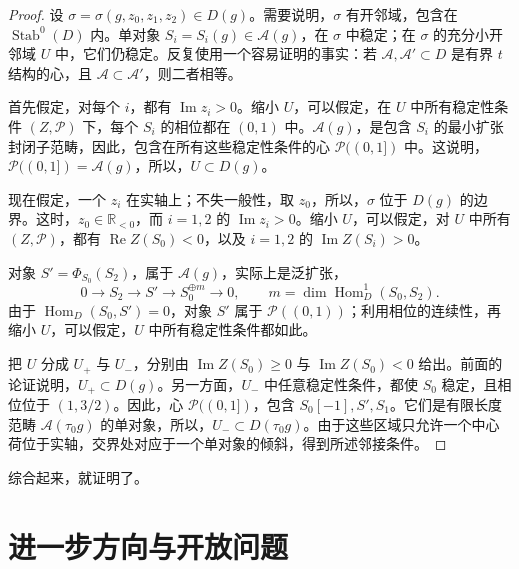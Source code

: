 \begin{proof}
设 $\sigma=\sigma(g,z_0,z_1,z_2)\in D(g)$。需要说明，$\sigma$ 有开邻域，包含在 $\operatorname{Stab}^0(D)$ 内。单对象 $S_i=S_i(g)\in\mathcal{A}(g)$，在 $\sigma$ 中稳定；在 $\sigma$ 的充分小开邻域 $U$ 中，它们仍稳定。反复使用一个容易证明的事实：若 $\mathcal{A},\mathcal{A}'\subset D$ 是有界 $t$ 结构的心，且 $\mathcal{A}\subset\mathcal{A}'$，则二者相等。

首先假定，对每个 $i$，都有 $\operatorname{Im}z_i>0$。缩小 $U$，可以假定，在 $U$ 中所有稳定性条件 $(Z,\mathcal{P})$ 下，每个 $S_i$ 的相位都在 $(0,1)$ 中。$\mathcal{A}(g)$，是包含 $S_i$ 的最小扩张封闭子范畴，因此，包含在所有这些稳定性条件的心 $\mathcal{P}((0,1])$ 中。这说明，$\mathcal{P}((0,1])=\mathcal{A}(g)$，所以，$U\subset D(g)$。

现在假定，一个 $z_i$ 在实轴上；不失一般性，取 $z_0$，所以，$\sigma$ 位于 $D(g)$ 的边界。这时，$z_0\in\mathbb{R}_{<0}$，而 $i=1,2$ 的 $\operatorname{Im}z_i>0$。缩小 $U$，可以假定，对 $U$ 中所有 $(Z,\mathcal{P})$，都有 $\operatorname{Re}Z(S_0)<0$，以及 $i=1,2$ 的 $\operatorname{Im}Z(S_i)>0$。

对象 $S'=\Phi_{S_0}(S_2)$，属于 $\mathcal{A}(g)$，实际上是泛扩张，
\[
0\longrightarrow S_2\longrightarrow S'
\longrightarrow S_0^{\oplus m}\longrightarrow0,
\qquad m=\dim\operatorname{Hom}_D^1(S_0,S_2).
\]
由于 $\operatorname{Hom}_D(S_0,S')=0$，对象 $S'$ 属于 $\mathcal{P}((0,1))$；利用相位的连续性，再缩小 $U$，可以假定，$U$ 中所有稳定性条件都如此。

把 $U$ 分成 $U_+$ 与 $U_-$，分别由 $\operatorname{Im}Z(S_0)\ge0$ 与 $\operatorname{Im}Z(S_0)<0$ 给出。前面的论证说明，$U_+\subset D(g)$。另一方面，$U_-$ 中任意稳定性条件，都使 $S_0$ 稳定，且相位位于 $(1,3/2)$。因此，心 $\mathcal{P}((0,1])$，包含 $S_0[-1],S',S_1$。它们是有限长度范畴 $\mathcal{A}(\tau_0g)$ 的单对象，所以，$U_-\subset D(\tau_0g)$。由于这些区域只允许一个中心荷位于实轴，交界处对应于一个单对象的倾斜，得到所述邻接条件。
\end{proof}

综合起来，就证明了。

\section{进一步方向与开放问题}\label{sec:5.9}

